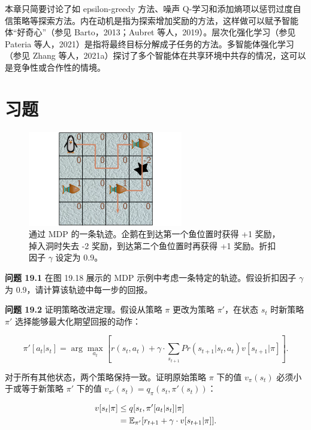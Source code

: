 本章只简要讨论了如 epsilon-greedy 方法、噪声 Q-学习和添加熵项以惩罚过度自信策略等探索方法。内在动机是指为探索增加奖励的方法，这样做可以赋予智能体“好奇心”（参见 Barto，2013；Aubret 等人，2019）。层次化强化学习（参见 Pateria 等人，2021）是指将最终目标分解成子任务的方法。多智能体强化学习（参见 Zhang 等人，2021a）探讨了多个智能体在共享环境中共存的情况，这可以是竞争性或合作性的情境。


\section{习题}

\begin{figure}[ht!]
\centering
\includegraphics[width=0.7\linewidth]{png/chapter19/ReinforceProbReturn.png}
\caption{通过 MDP 的一条轨迹。企鹅在到达第一个鱼位置时获得 +1 奖励，掉入洞时失去 -2 奖励，到达第二个鱼位置时再获得 +1 奖励。折扣因子 \(\gamma\) 设定为 0.9。}
\end{figure}

\textbf{问题 19.1} 在图 19.18 展示的 MDP 示例中考虑一条特定的轨迹。假设折扣因子 \(\gamma\) 为 0.9，请计算该轨迹中每一步的回报。

\textbf{问题 19.2} 证明策略改进定理。假设从策略 \(\pi\) 更改为策略 \(\pi'\)，在状态 \(s_t\) 时新策略 \(\pi'\) 选择能够最大化期望回报的动作：

\begin{equation}
\pi'[a_t|s_t] = \arg\max_{a_t} \left[ r(s_t, a_t) + \gamma \cdot \sum_{s_{t+1}} Pr(s_{t+1} | s_t, a_t)v[s_{t+1} | \pi] \right]. 
\end{equation}

对于所有其他状态，两个策略保持一致。证明原始策略 \(\pi\) 下的值 \(v_{\pi}(s_t)\) 必须小于或等于新策略 \(\pi'\) 下的值 \(v_{\pi'}(s_t) = q_{\pi}(s_t, \pi'(s_t))\)：


\begin{align}
v[s_t | \pi] &\leq q[s_t, \pi'[a_t|s_t] | \pi] \notag\\
&= \mathbb{E}_{\pi'}[r_{t+1} + \gamma \cdot v[s_{t+1} | \pi]]. 
\end{align} 


